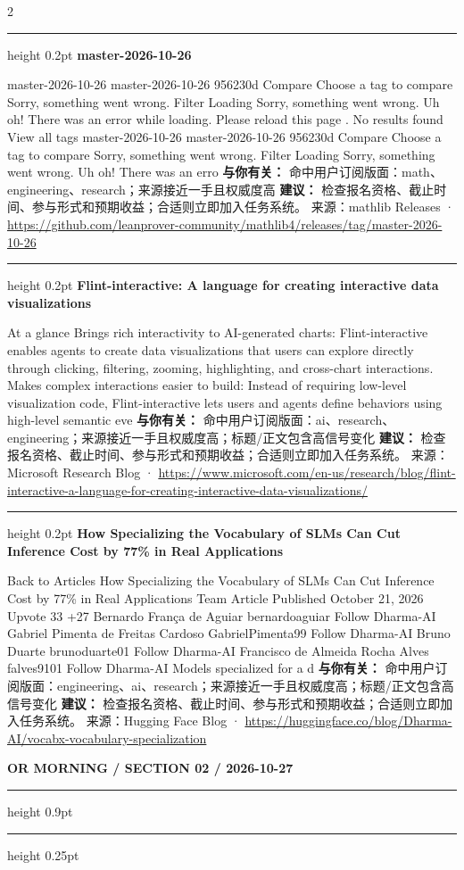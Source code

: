 \documentclass[10.5pt]{ctexart}
\begin{document}
\begin{multicols}{2}
\vspace{2mm}
\hrule height 0.2pt
\vspace{2mm}
{\large\bfseries master-2026-10-26}\par
master-2026-10-26 master-2026-10-26 956230d Compare Choose a tag to compare Sorry, something went wrong. Filter Loading Sorry, something went wrong. Uh oh! There was an error while loading. Please reload this page . No results found View all tags master-2026-10-26 master-2026-10-26 956230d Compare Choose a tag to compare Sorry, something went wrong. Filter Loading Sorry, something went wrong. Uh oh! There was an erro
\textbf{与你有关：} 命中用户订阅版面：math、engineering、research；来源接近一手且权威度高
\textbf{建议：} 检查报名资格、截止时间、参与形式和预期收益；合适则立即加入任务系统。
{\footnotesize\color{ormuted} 来源：mathlib Releases · \url{https://github.com/leanprover-community/mathlib4/releases/tag/master-2026-10-26}}
\vspace{2mm}
\hrule height 0.2pt
\vspace{2mm}
{\large\bfseries Flint-interactive: A language for creating interactive data visualizations}\par
At a glance Brings rich interactivity to AI-generated charts: Flint-interactive enables agents to create data visualizations that users can explore directly through clicking, filtering, zooming, highlighting, and cross-chart interactions. Makes complex interactions easier to build: Instead of requiring low-level visualization code, Flint-interactive lets users and agents define behaviors using high-level semantic eve
\textbf{与你有关：} 命中用户订阅版面：ai、research、engineering；来源接近一手且权威度高；标题/正文包含高信号变化
\textbf{建议：} 检查报名资格、截止时间、参与形式和预期收益；合适则立即加入任务系统。
{\footnotesize\color{ormuted} 来源：Microsoft Research Blog · \url{https://www.microsoft.com/en-us/research/blog/flint-interactive-a-language-for-creating-interactive-data-visualizations/}}
\vspace{2mm}
\hrule height 0.2pt
\vspace{2mm}
{\large\bfseries How Specializing the Vocabulary of SLMs Can Cut Inference Cost by 77\% in Real Applications}\par
Back to Articles How Specializing the Vocabulary of SLMs Can Cut Inference Cost by 77\% in Real Applications Team Article Published October 21, 2026 Upvote 33 +27 Bernardo França de Aguiar bernardoaguiar Follow Dharma-AI Gabriel Pimenta de Freitas Cardoso GabrielPimenta99 Follow Dharma-AI Bruno Duarte brunoduarte01 Follow Dharma-AI Francisco de Almeida Rocha Alves falves9101 Follow Dharma-AI Models specialized for a d
\textbf{与你有关：} 命中用户订阅版面：engineering、ai、research；来源接近一手且权威度高；标题/正文包含高信号变化
\textbf{建议：} 检查报名资格、截止时间、参与形式和预期收益；合适则立即加入任务系统。
{\footnotesize\color{ormuted} 来源：Hugging Face Blog · \url{https://huggingface.co/blog/Dharma-AI/vocabx-vocabulary-specialization}}
\end{multicols}
\newpage
{\small\bfseries OR MORNING / SECTION 02 / 2026-10-27}
\vspace{2mm}
\hrule height 0.9pt
\vspace{1.5mm}
\hrule height 0.25pt
\vspace{4mm}
\end{document}
